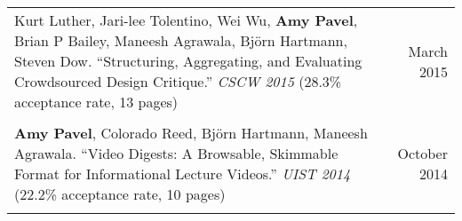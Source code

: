 \begin{longtable}{Xr}
	Kurt Luther, Jari-lee Tolentino, Wei Wu, \textbf{Amy Pavel}, Brian P Bailey, Maneesh Agrawala, Björn Hartmann, Steven Dow. ``Structuring, Aggregating, and Evaluating Crowdsourced Design Critique.'' \textit{CSCW 2015} (28.3\% acceptance rate, 13 pages) & March 2015 \\
	\\

	\textbf{Amy Pavel}, Colorado Reed, Björn Hartmann, Maneesh Agrawala. ``Video Digests: A Browsable, Skimmable Format for Informational Lecture Videos.'' \textit{UIST 2014} (22.2\% acceptance rate, 10 pages) & October 2014 \\
	\\

\end{longtable}